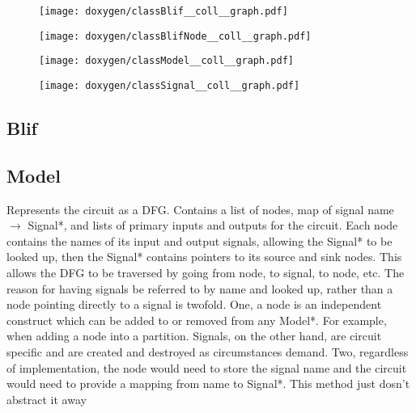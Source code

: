 \documentclass[12pt,final,oneside]{article} %
\begin{document}
   \begin{figure}
      \texttt{[image: doxygen/classBlif\_\_coll\_\_graph.pdf]}
   \end{figure}
   \begin{figure}
      \texttt{[image: doxygen/classBlifNode\_\_coll\_\_graph.pdf]}
   \end{figure}
   \begin{figure}
      \texttt{[image: doxygen/classModel\_\_coll\_\_graph.pdf]}
   \end{figure}
   \begin{figure}
      \texttt{[image: doxygen/classSignal\_\_coll\_\_graph.pdf]}
   \end{figure}

   \subsection{Blif}
      
   \subsection{Model}
      Represents the circuit as a DFG. Contains a list of nodes, map of signal name $\to$ Signal*, and lists of primary inputs and outputs for the circuit.
      Each node contains the names of its input and output signals, allowing the Signal* to be looked up, then the Signal* contains pointers to its source and sink nodes.
      This allows the DFG to be traversed by going from node, to signal, to node, etc.
      The reason for having signals be referred to by name and looked up, rather than a node pointing directly to a signal is twofold.
      One, a node is an independent construct which can be added to or removed from any Model*. For example, when adding a node into a partition. Signals, on the other hand, are circuit specific and are created and destroyed as circumstances demand.
      Two, regardless of implementation, the node would need to store the signal name and the circuit would need to provide a mapping from name to Signal*. This method just dosn't abstract it away 

\newpage
\end{document}
